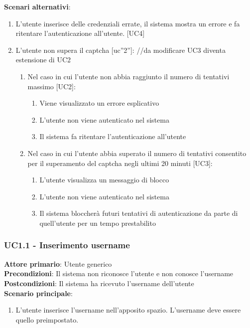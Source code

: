 \textbf{Scenari alternativi}:
\begin{enumerate}
    \item L’utente inserisce delle credenziali errate, il sistema mostra un errore e fa ritentare l’autenticazione all’utente. [UC4]
    \item L’utente non supera il captcha [uc”2”]: //da modificare UC3 diventa estensione di UC2
    \begin{enumerate}
	\item Nel caso in cui l’utente non abbia raggiunto il numero di tentativi massimo [UC2]:
	\begin{enumerate}
	    \item Viene visualizzato un errore esplicativo
	    \item L’utente non viene autenticato nel sistema
	    \item Il sistema fa ritentare l’autenticazione all’utente 
        \end{enumerate}
	\item Nel caso in cui l’utente abbia superato il numero di tentativi consentito per il superamento del captcha negli ultimi 20 minuti [UC3]:
	\begin{enumerate}
	    \item L’utente visualizza un messaggio di blocco
	    \item L’utente non viene autenticato nel sistema
	    \item Il sistema bloccherà futuri tentativi di autenticazione da parte di quell’utente per un tempo prestabilito
        \end{enumerate}
    \end{enumerate}
\end{enumerate}

\subsubsection{UC1.1 - Inserimento username}
\textbf{Attore primario}: Utente generico\\
\textbf{Precondizioni}: Il sistema non riconosce l'utente e non conosce l’username\\
\textbf{Postcondizioni}: Il sistema ha ricevuto l’username dell’utente\\
\textbf{Scenario principale}:
\begin{enumerate}
   \item L’utente inserisce l’username nell’apposito spazio. L’username deve essere quello preimpostato.
\end{enumerate}

